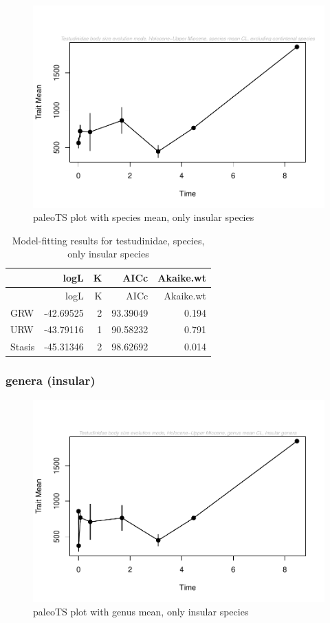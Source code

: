 \documentclass[]{article}
\begin{document}
\begin{figure}[htbp]
\centering
\includegraphics{MA_JJ_files/figure-latex/paleoTS plot with species mean, excluding continental species-1.pdf}
\caption{paleoTS plot with species mean, only insular species}
\end{figure}

\begin{longtable}[]{@{}lrrrr@{}}
\caption{Model-fitting results for testudinidae, species, only insular
species}\tabularnewline
\toprule
& logL & K & AICc & Akaike.wt\tabularnewline
\midrule
\endfirsthead
\toprule
& logL & K & AICc & Akaike.wt\tabularnewline
\midrule
\endhead
GRW & -42.69525 & 2 & 93.39049 & 0.194\tabularnewline
URW & -43.79116 & 1 & 90.58232 & 0.791\tabularnewline
Stasis & -45.31346 & 2 & 98.62692 & 0.014\tabularnewline
\bottomrule
\end{longtable}

\newpage

\subsubsection{genera (insular)}\label{genera-insular}

\begin{figure}[htbp]
\centering
\includegraphics{MA_JJ_files/figure-latex/paleoTS plot with genus mean, excluding continental species-1.pdf}
\caption{paleoTS plot with genus mean, only insular species}
\end{figure}
\end{document}

